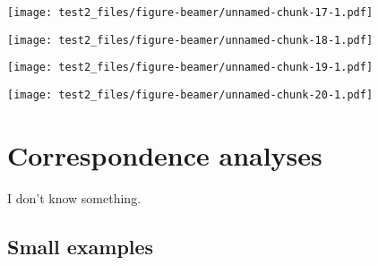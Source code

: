 \documentclass[
  ignorenonframetext,
]{beamer}
\begin{document}
\begin{frame}

\texttt{[image: test2\_files/figure-beamer/unnamed-chunk-17-1.pdf]}

\end{frame}

\begin{frame}

\texttt{[image: test2\_files/figure-beamer/unnamed-chunk-18-1.pdf]}

\end{frame}

\begin{frame}

\texttt{[image: test2\_files/figure-beamer/unnamed-chunk-19-1.pdf]}

\end{frame}

\begin{frame}

\texttt{[image: test2\_files/figure-beamer/unnamed-chunk-20-1.pdf]}

\end{frame}

\hypertarget{correspondence-analyses}{%
\section{Correspondence analyses}\label{correspondence-analyses}}

\begin{frame}{}
\protect\hypertarget{section}{}

I don't know something.

\end{frame}

\hypertarget{small-examples}{%
\subsection{Small examples}\label{small-examples}}
\end{document}
